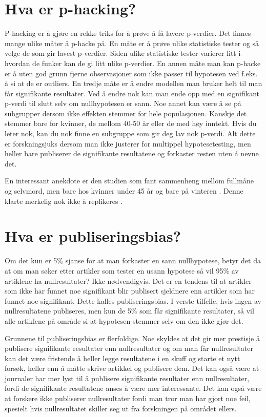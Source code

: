 \documentclass[doc,norsk]{apa7}
\begin{document}
\section{Hva er p-hacking?}
P-hacking er å gjøre en rekke triks for å prøve å få lavere p-verdier. Det finnes mange ulike måter å p-hacke på. En måte er å prøve ulike statistiske tester og så velge de som gir lavest p-verdier. Siden ulike statistiske tester varierer litt i hvordan de funker kan de gi litt ulike p-verdier. En annen måte man kan p-hacke er å uten god grunn fjerne observasjoner som ikke passer til hypotesen ved f.eks. å si at de er outliers. En tredje måte er å endre modellen man bruker helt til man får signifikante resultater. Ved å endre nok kan man ende opp med en signifikant p-verdi til slutt selv om nullhypotesen er sann. Noe annet kan være å se på subgrupper dersom ikke effekten stemmer for hele populasjonen. Kanskje det stemmer bare for kvinner, de mellom 40-50 år eller de med høy inntekt. Hvis du leter nok, kan du nok finne en subgruppe som gir deg lav nok p-verdi. Alt dette er forskningsjuks dersom man ikke justerer for multippel hypotesetesting, men heller bare publiserer de signifikante resultatene og forkaster resten uten å nevne det.

En interessant anekdote er den studien som fant sammenheng mellom fullmåne og selvmord, men bare hos kvinner under 45 år og bare på vinteren \parencite{selvmord-vinter-2}. Denne klarte merkelig nok ikke å replikeres \parencite{selvmord-vinter}.

\section{Hva er publiseringsbias?}
Om det kun er 5\% sjanse for at man forkaster en sann nullhypotese, betyr det da at om man søker etter artikler som tester en usann hypotese så vil 95\% av artiklene ha nullresultater? Ikke nødvendigvis. Det er en tendens til at artikler som ikke har funnet noe signifikant blir publisert sjeldnere enn artikler som har funnet noe signifikant. Dette kalles publiseringsbias. I verste tilfelle, hvis ingen av nullresultatene publiseres, men kun de 5\% som får signifikante resultater, så vil alle artiklene på område si at hypotesen stemmer selv om den ikke gjør det.

Grunnene til publiseringsbias er flerfoldige. Noe skyldes at det gir mer prestisje å publisere signifikante resultater enn nullresultater og om man får nullresultater kan det være fristende å heller legge resultatene i en skuff og starte et nytt forsøk, heller enn å måtte skrive artikkel og publisere dem. Det kan også være at journaler har mer lyst til å publisere signifikante resultater enn nullresultater, fordi de signifikante resultatene anses å være mer interessante. Det kan også være at forskere ikke publiserer nullresultater fordi man tror man har gjort noe feil, spesielt hvis nullresultatet skiller seg ut fra forskningen på området ellers.
\end{document}
